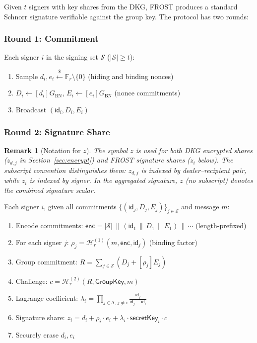 \documentclass[11pt,a4paper]{article}
\newtheorem{remark}{Remark}[section]
\newcommand{\F}{\mathbb{F}}
\newcommand{\Fr}{\F_r}
\newcommand{\genbn}{G_{\mathrm{BN}}}
\newcommand{\id}{\mathsf{id}}
\newcommand{\hash}{\mathcal{H}}
\newcommand{\getsr}{\xleftarrow{\$}}
\begin{document}
Given $t$ signers with key shares from the DKG, FROST produces a standard
Schnorr signature verifiable against the group key. The protocol has two
rounds:

\subsubsection{Round 1: Commitment}

Each signer $i$ in the signing set $\mathcal{S}$ ($|\mathcal{S}| \ge t$):
\begin{enumerate}[nosep]
  \item Sample $d_i, e_i \getsr \Fr \setminus \{0\}$ \hfill (hiding and binding nonces)
  \item $D_i \leftarrow [d_i]\genbn$, \quad $E_i \leftarrow [e_i]\genbn$
    \hfill (nonce commitments)
  \item Broadcast $(\id_i, D_i, E_i)$
\end{enumerate}

\subsubsection{Round 2: Signature Share}

\begin{remark}[Notation for $z$]
  The symbol $z$ is used for both DKG encrypted shares ($z_{d,j}$ in
  Section~\ref{sec:encrypt}) and FROST signature shares ($z_i$ below). The
  subscript convention distinguishes them: $z_{d,j}$ is indexed by
  dealer--recipient pair, while $z_i$ is indexed by signer. In the aggregated
  signature, $z$ (no subscript) denotes the combined signature scalar.
\end{remark}

Each signer $i$, given all commitments $\{(\id_j, D_j, E_j)\}_{j \in \mathcal{S}}$
and message $m$:
\begin{enumerate}[nosep]
  \item Encode commitments:
    $\mathsf{enc} = |\mathcal{S}| \,\|\, (\id_1 \,\|\, D_1 \,\|\, E_1) \,\|\, \cdots$
    (length-prefixed)
  \item For each signer $j$: $\rho_j = \hash_r^{(1)}(m, \mathsf{enc}, \id_j)$
    \hfill (binding factor)
  \item Group commitment: $R = \sum_{j \in \mathcal{S}} (D_j + [\rho_j] E_j)$
  \item Challenge: $c = \hash_r^{(2)}(R, \mathsf{GroupKey}, m)$
  \item Lagrange coefficient:
    $\lambda_i = \prod_{j \in \mathcal{S},\, j \ne i} \frac{\id_j}{\id_j - \id_i}$
  \item Signature share: $z_i = d_i + \rho_i \cdot e_i + \lambda_i \cdot \mathsf{secretKey}_i \cdot c$
  \item Securely erase $d_i, e_i$
\end{enumerate}
\end{document}

